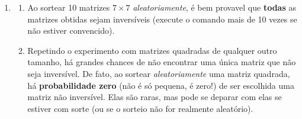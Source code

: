 \documentclass[12pt,a4paper]{article}
\begin{document}
\begin{enumerate}
\item 
\begin{enumerate}
\item Ao sortear 10 matrizes $7 \times 7$ \textit{aleatoriamente}, é bem provavel que \textbf{todas} as matrizes obtidas sejam inversíveis (execute o comando mais de 10 vezes se não estiver convencido).
\item Repetindo o experimento com matrizes quadradas de qualquer outro tamanho, há grandes chances de não encontrar uma única matriz que não seja inversível. De fato, ao sortear \textit{aleatoriamente} uma matriz quadrada, há \textbf{probabilidade zero} (não é só pequena, é zero!) de ser escolhida uma matriz não inversível. Elas são raras, mas pode se deparar com elas se estiver com sorte (ou se o sorteio não for realmente aleatório).


\end{enumerate}
\end{enumerate}
\end{document}
